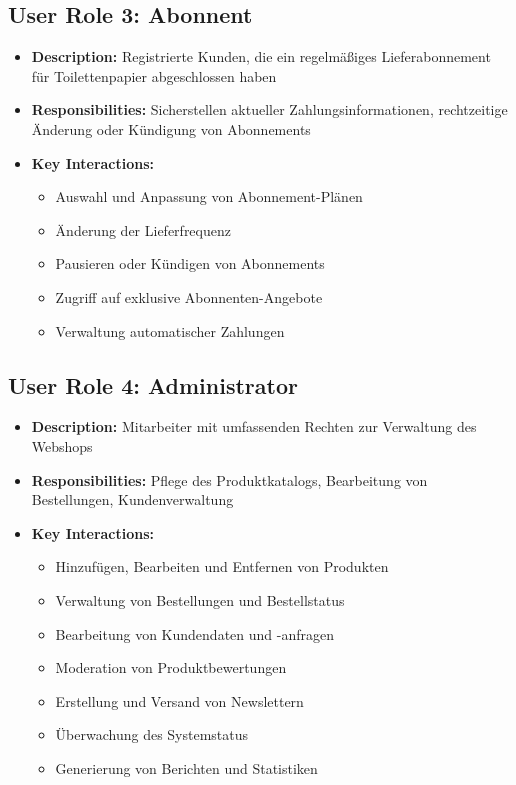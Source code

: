 \documentclass[a4paper,11pt]{article}
\begin{document}
\subsection{User Role 3: Abonnent}
\begin{itemize}
    \item \textbf{Description:} Registrierte Kunden, die ein regelmäßiges Lieferabonnement für Toilettenpapier abgeschlossen haben
    \item \textbf{Responsibilities:} Sicherstellen aktueller Zahlungsinformationen, rechtzeitige Änderung oder Kündigung von Abonnements
    \item \textbf{Key Interactions:} 
    \begin{itemize}
        \item Auswahl und Anpassung von Abonnement-Plänen
        \item Änderung der Lieferfrequenz
        \item Pausieren oder Kündigen von Abonnements
        \item Zugriff auf exklusive Abonnenten-Angebote
        \item Verwaltung automatischer Zahlungen
    \end{itemize}
\end{itemize}

\subsection{User Role 4: Administrator}
\begin{itemize}
    \item \textbf{Description:} Mitarbeiter mit umfassenden Rechten zur Verwaltung des Webshops
    \item \textbf{Responsibilities:} Pflege des Produktkatalogs, Bearbeitung von Bestellungen, Kundenverwaltung
    \item \textbf{Key Interactions:} 
    \begin{itemize}
        \item Hinzufügen, Bearbeiten und Entfernen von Produkten
        \item Verwaltung von Bestellungen und Bestellstatus
        \item Bearbeitung von Kundendaten und -anfragen
        \item Moderation von Produktbewertungen
        \item Erstellung und Versand von Newslettern
        \item Überwachung des Systemstatus
        \item Generierung von Berichten und Statistiken
    \end{itemize}
\end{itemize}
\end{document}
